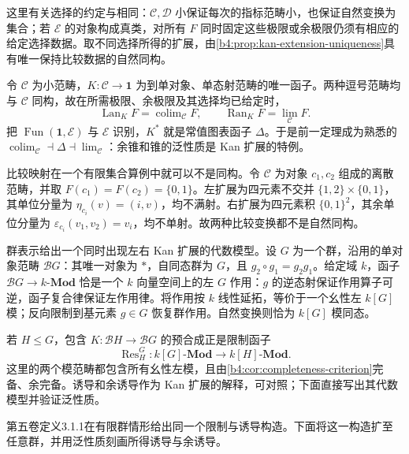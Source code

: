 这里有关选择的约定与相同：\(\mathcal C,\mathcal D\) 小保证每次的指标范畴小，也保证自然变换为集合；若 \(\mathcal E\) 的对象构成真类，对所有 \(F\) 同时固定这些极限或余极限仍须有相应的给定选择数据。取不同选择所得的扩展，由\cref{b4:prop:kan-extension-uniqueness}具有唯一保持比较数据的自然同构。

\begin{example}[常值图表的左右伴随]\label{b4:exm:kan-limits-colimits}
	令 \(\mathcal C\) 为小范畴，\(K:\mathcal C\rightarrow\mathbf1\) 为到单对象、单态射范畴的唯一函子。两种逗号范畴均与 \(\mathcal C\) 同构，故在所需极限、余极限及其选择均已给定时，
	\[
		\operatorname{Lan}_K F=\operatorname{colim}_{\mathcal C}F,
		\qquad
		\operatorname{Ran}_K F=\lim_{\mathcal C}F.
	\]
	把 \(\operatorname{Fun}(\mathbf1,\mathcal E)\) 与 \(\mathcal E\) 识别，\(K^*\) 就是常值图表函子 \(\Delta\)。于是前一定理成为熟悉的
	\(\operatorname{colim}_{\mathcal C}\dashv\Delta\dashv\lim_{\mathcal C}\)：余锥和锥的泛性质是 Kan 扩展的特例。

	\ProseParagraphBreak
	比较映射在一个有限集合算例中就可以不是同构。令 \(\mathcal C\) 为对象 \(c_1,c_2\) 组成的离散范畴，并取 \(F(c_1)=F(c_2)=\{0,1\}\)。左扩展为四元素不交并 \(\{1,2\}\times\{0,1\}\)，其单位分量为 \(\eta_{c_i}(v)=(i,v)\)，均不满射。右扩展为四元素积 \(\{0,1\}^2\)，其余单位分量为 \(\varepsilon_{c_i}(v_1,v_2)=v_i\)，均不单射。故两种比较变换都不是自然同构。
\end{example}

群表示给出一个同时出现左右 Kan 扩展的代数模型。设 \(G\) 为一个群，沿用的单对象范畴 \(\mathcal BG\)：其唯一对象为 \(*\)，自同态群为 \(G\)，且 \(g_2\circ g_1=g_2g_1\)。给定域 \(k\)，函子 \(\mathcal BG\rightarrow k\text{-}\mathbf{Mod}\) 恰是一个 \(k\) 向量空间上的左 \(G\) 作用：\(g\) 的逆态射保证作用算子可逆，函子复合律保证左作用律。将作用按 \(k\) 线性延拓，等价于一个幺性左 \(k[G]\) 模；反向限制到基元素 \(g\in G\) 恢复群作用。自然变换则恰为 \(k[G]\) 模同态。

\ProseParagraphBreak
若 \(H\le G\)，包含 \(K:\mathcal BH\rightarrow\mathcal BG\) 的预合成正是限制函子
\[
	\operatorname{Res}^G_H:
	k[G]\text{-}\mathbf{Mod}\longrightarrow k[H]\text{-}\mathbf{Mod}.
\]
这里的两个模范畴都包含所有幺性左模，且由\cref{b4:cor:completeness-criterion}完备、余完备。诱导和余诱导作为 Kan 扩展的解释，可对照\cite[Example 6.1.7; Example 6.2.8]{Riehl2016CategoryTheory}；下面直接写出其代数模型并验证泛性质。

\ProseParagraphBreak
第五卷定义3.1.1在有限群情形给出同一个限制与诱导构造。下面将这一构造扩至任意群，并用泛性质刻画所得诱导与余诱导。

